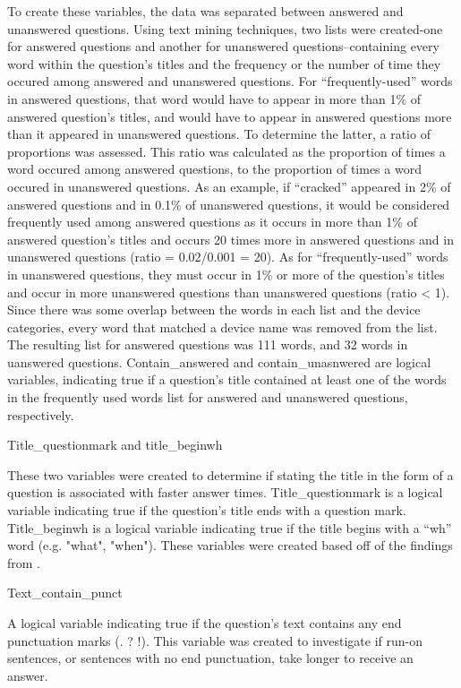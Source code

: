 \documentclass[12pt]{article}
\begin{document}
  To create these variables, the data was separated between answered and unanswered questions. Using text mining techniques, two lists were created-one for answered questions and another for unanswered questions--containing every word within the question's titles and the frequency or the number of time they occured among answered and unanswered questions. For ``frequently-used'' words in answered questions, that word would have to appear in more than 1\% of answered question's titles, and would have to appear in answered questions more than it appeared in unanswered questions. To determine the latter, a ratio of proportions was assessed. This ratio was calculated as the proportion of times a word occured among answered questions, to the proportion of times a word occured in unanswered questions. As an example, if ``cracked'' appeared in 2\% of answered questions and in 0.1\% of unanswered questions, it would be considered frequently used among answered questions as it occurs in more than 1\% of answered question's titles and occurs 20 times more in answered questions and in unanswered questions (ratio = 0.02/0.001 = 20). As for ``frequently-used'' words in unanswered questions, they must occur in 1\% or more of the question's titles and occur in more unanswered questions than unanswered questions (ratio < 1). Since there was some overlap between the words in each list and the device categories, every word that matched a device name was removed from the list. The resulting list for answered questions was 111 words, and 32 words in uanswered questions. Contain_answered and contain_unasnwered are logical variables, indicating true if a question's title contained at least one of the words in the frequently used words list for answered and unanswered questions, respectively. 
  
Title\_questionmark and title\_beginwh 

These two variables were created to determine if stating the title in the form of a question is associated with faster answer times. Title_questionmark is a logical variable indicating true if the question's title ends with a question mark. Title_beginwh is a logical variable indicating true if the title begins with a “wh” word (e.g. "what", "when"). These variables were created based off of the findings from \citep{Bhat2014}. 
  
  
Text\_contain\_punct

A logical variable indicating true if the question’s text contains any end punctuation marks (. ? !). This variable was created to investigate if run-on sentences, or sentences with no end punctuation, take longer to receive an answer. 
\end{document}
